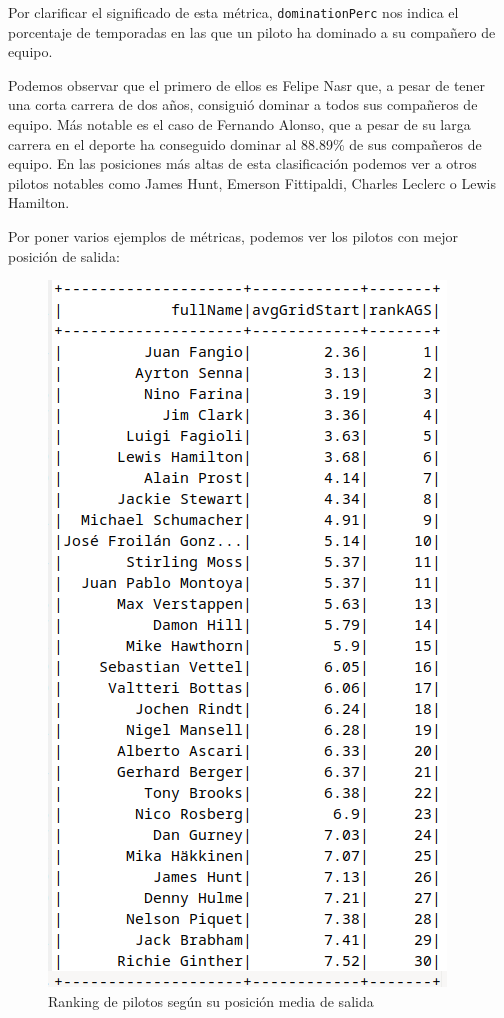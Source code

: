 \documentclass[12pt,twoside,titlepage]{report}
\begin{document}
Por clarificar el significado de esta métrica, \texttt{dominationPerc} nos indica el porcentaje de temporadas en las que un piloto ha dominado a su compañero de equipo.

Podemos observar que el primero de ellos es Felipe Nasr que, a pesar de tener una corta carrera de dos años, consiguió dominar a todos sus compañeros de equipo. Más notable es el caso de Fernando Alonso, que a pesar de su larga carrera en el deporte ha conseguido dominar al 88.89\% de sus compañeros de equipo. En las posiciones más altas de esta clasificación podemos ver a otros pilotos notables como James Hunt, Emerson Fittipaldi, Charles Leclerc o Lewis Hamilton.

Por poner varios ejemplos de métricas, podemos ver los pilotos con mejor posición de salida:

\begin{figure}[H]
	\includegraphics[scale=0.3]{results/bestdrivers/avggridstart.png}
	\centering
	\caption{Ranking de pilotos según su posición media de salida}
	\label{fig:avgGridStart}
	\centering
\end{figure}
\end{document}
